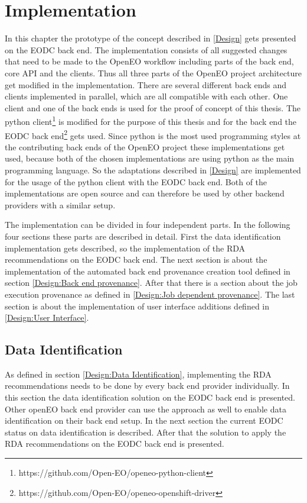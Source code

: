 \documentclass[draft,final]{vutinfth} %
\begin{document}

\chapter{Implementation}\label{Implementation}
In this chapter the prototype of the concept described in \ref{Design} gets presented on the EODC back end. The implementation consists of all suggested changes that need to be made to the OpenEO workflow including parts of the back end, core API and the clients. Thus all three parts of the OpenEO project architecture get modified in the implementation. There are several different back ends and clients implemented in parallel, which are all compatible with each other. One client and one of the back ends is used for the proof of concept of this thesis. The python client\footnote{https://github.com/Open-EO/openeo-python-client} is modified for the purpose of this thesis and for the back end the EODC back end\footnote{https://github.com/Open-EO/openeo-openshift-driver} gets used. Since python is the most used programming styles at the contributing back ends of the OpenEO project these implementations get used, because both of the chosen implementations are using python as the main programming language. So the adaptations described in \ref{Design} are implemented for the usage of the python client with the EODC back end. Both of the implementations are open source and can therefore be used by other backend providers with a similar setup.  

The implementation can be divided in four independent parts. In the following four sections these parts are described in detail. First the data identification implementation gets described, so the implementation of the RDA recommendations on the EODC back end. The next section is about the implementation of the automated back end provenance creation tool defined in section \ref{Design:Back end provenance}. After that there is a section about the job execution provenance as defined in \ref{Design:Job dependent provenance}. The last section is about the implementation of user interface additions defined in \ref{Design:User Interface}.     

\section{Data Identification}\label{Implementation:Data Identification}

As defined in section \ref{Design:Data Identification}, implementing the RDA recommendations needs to be done by every back end provider individually. In this section the data identification solution on the EODC back end is presented. Other openEO back end provider can use the approach as well to enable data identification on their back end setup. 
In the next section the current EODC status on data identification is described. After that the solution to apply the RDA recommendations on the EODC back end is presented. 
  
\end{document}
